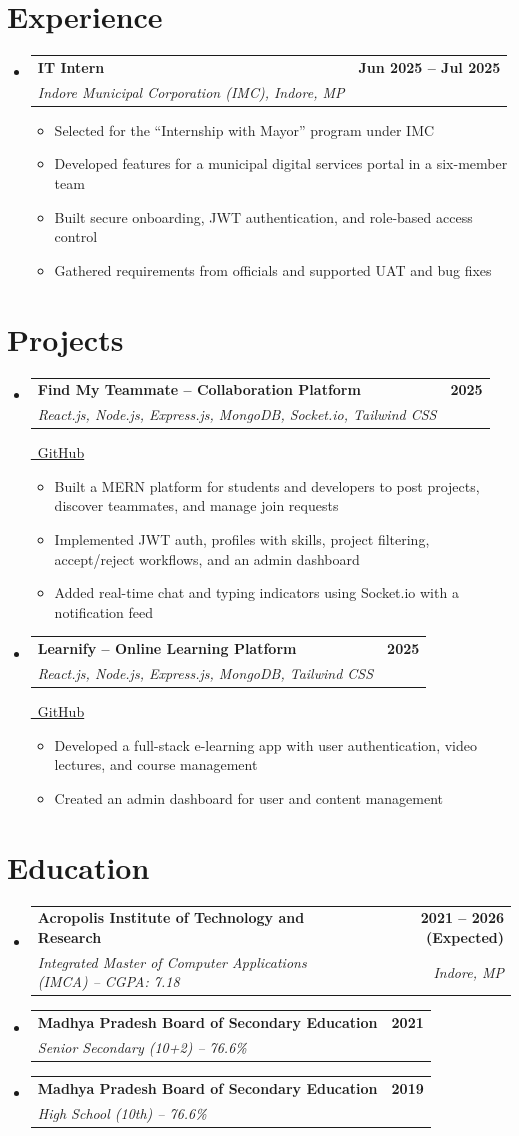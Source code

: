 \documentclass[letterpaper,11pt]{article}
\makeatletter
\newcommand{\resumeSubheading}[4]{
  \vspace{-2pt}\item
    \begin{tabular*}{\textwidth}[t]{l@{\extracolsep{\fill}}r}
      \textbf{#1} & \textbf{#2} \\
      \textit{\small #3} & \textit{\small #4} \\
    \end{tabular*}\vspace{-7pt}
}
\newcommand{\resumeProjectHeading}[3]{
  \vspace{-2pt}\item
    \begin{tabular*}{\textwidth}[t]{l@{\extracolsep{\fill}}r}
      \textbf{#1} & \textbf{#2} \\
      \textit{\small #3} & \\
    \end{tabular*}\vspace{-7pt}
}
\newcommand{\resumeItem}[1]{
  \item\small{\color{bodycolor} #1 \vspace{-2pt}}
}
\newcommand{\resumeSubHeadingListStart}{\begin{itemize}[leftmargin=0.0in, label={}]}
\newcommand{\resumeSubHeadingListEnd}{\end{itemize}}
\newcommand{\resumeItemListStart}{\begin{itemize}[leftmargin=0.15in]}
\newcommand{\resumeItemListEnd}{\end{itemize}\vspace{-5pt}}
\makeatother
\begin{document}
\section{Experience}
\resumeSubHeadingListStart
  \resumeSubheading
    {IT Intern}{Jun 2025 -- Jul 2025}
    {Indore Municipal Corporation (IMC), Indore, MP}{}
  \resumeItemListStart
    \resumeItem{Selected for the ``Internship with Mayor'' program under IMC}
    \resumeItem{Developed features for a municipal digital services portal in a six-member team}
    \resumeItem{Built secure onboarding, JWT authentication, and role-based access control}
    \resumeItem{Gathered requirements from officials and supported UAT and bug fixes}
  \resumeItemListEnd
\resumeSubHeadingListEnd

\section{Projects}
\resumeSubHeadingListStart

  \resumeProjectHeading
    {Find My Teammate -- Collaboration Platform}{2025}
    {React.js, Node.js, Express.js, MongoDB, Socket.io, Tailwind CSS}
  \hfill
  \small
  \href{https://github.com/sarthak2131}{\faGithub\ GitHub}
  \resumeItemListStart
    \resumeItem{Built a MERN platform for students and developers to post projects, discover teammates, and manage join requests}
    \resumeItem{Implemented JWT auth, profiles with skills, project filtering, accept/reject workflows, and an admin dashboard}
    \resumeItem{Added real-time chat and typing indicators using Socket.io with a notification feed}
  \resumeItemListEnd

  \resumeProjectHeading
    {Learnify -- Online Learning Platform}{2025}
    {React.js, Node.js, Express.js, MongoDB, Tailwind CSS}
  \hfill
  \small
  \href{https://github.com/sarthak2131}{\faGithub\ GitHub}
  \resumeItemListStart
    \resumeItem{Developed a full-stack e-learning app with user authentication, video lectures, and course management}
    \resumeItem{Created an admin dashboard for user and content management}
  \resumeItemListEnd

\resumeSubHeadingListEnd

\section{Education}
\resumeSubHeadingListStart
  \resumeSubheading
    {Acropolis Institute of Technology and Research}{2021 -- 2026 (Expected)}
    {Integrated Master of Computer Applications (IMCA) -- CGPA: 7.18}{Indore, MP}
  \resumeSubheading
    {Madhya Pradesh Board of Secondary Education}{2021}
    {Senior Secondary (10+2) -- 76.6\%}{}
  \resumeSubheading
    {Madhya Pradesh Board of Secondary Education}{2019}
    {High School (10th) -- 76.6\%}{}
\resumeSubHeadingListEnd
\end{document}
